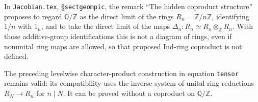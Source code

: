 \begin{proposition}
\label{AC-G21}
In \texttt{Jacobian.tex}, \S\texttt{sectgeompic}, the remark
``The hidden coproduct structure'' proposes to regard
$\mathbb Q/\mathbb Z$ as the direct limit of the rings
$R_n=\mathbb Z/n\mathbb Z$, identifying $1/n$ with $1_n$,
and to take the direct limit of the maps
$\Delta_n:R_n\simeq R_n\otimes_{\mathbb Z}R_n$.
With those additive-group identifications this is not a diagram of
rings, even if nonunital ring maps are allowed, so that proposed
Ind-ring coproduct is not defined.

The preceding levelwise character-product construction in equation
\texttt{tensor} remains valid: its compatibility uses the inverse
system of unital ring reductions $R_N\to R_n$ for $n\mid N$.
It can be proved without a coproduct on $\mathbb Q/\mathbb Z$.
\end{proposition}
